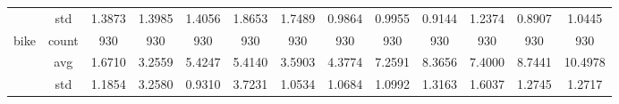 \begin{table}[htbp]
{\begin{tabular}{rcccccccccccc}
                                                     & std                                    & 1.3873                                                                             & 1.3985                                                                    & 1.4056                                                                    & 1.8653                                                                    & 1.7489                                        & 0.9864                                      & 0.9955                                         & 0.9144                                         & 1.2374                                         & 0.8907                                         & 1.0445                                         \\
                  bike                               & count                                  & 930                                                                                & 930                                                                       & 930                                                                       & 930                                                                       & 930                                           & 930                                         & 930                                            & 930                                            & 930                                            & 930                                            & 930                                            \\
                                                     & avg                                    & \cellcolor[rgb]{ .776,  .937,  .808}\textcolor[rgb]{ 0,  .38,  0}{1.6710}          & 3.2559                                                                    & 5.4247                                                                    & 5.4140                                                                    & 3.5903                                        & 4.3774                                      & 7.2591                                         & 8.3656                                         & 7.4000                                         & 8.7441                                         & 10.4978                                        \\
                                                     & std                                    & 1.1854                                                                             & 3.2580                                                                    & 0.9310                                                                    & 3.7231                                                                    & 1.0534                                        & 1.0684                                      & 1.0992                                         & 1.3163                                         & 1.6037                                         & 1.2745                                         & 1.2717                                         \\

\end{tabular}}
\end{table}
